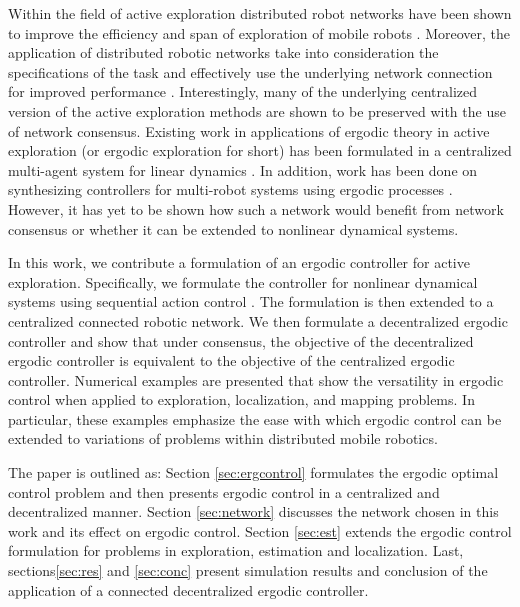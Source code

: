 \documentclass[letterpaper, 10 pt,  conference, twoside]{IEEEtran/IEEEtran}
\theoremstyle{definition}
\begin{document}
Within the field of active exploration distributed robot networks have been shown to improve the efficiency and span of exploration of mobile robots \cite{carmel1999exploration, dudek1996taxonomy, manss2016decentralized}. Moreover, the application of distributed robotic networks take into consideration the specifications of the task and effectively use the underlying network connection for improved performance \cite{manss2016decentralized, viseras2014efficient, khamis2014adaptive, pei2014distributed}. Interestingly, many of the underlying centralized version of the active exploration methods are shown to be preserved with the use of network consensus. Existing work in applications of ergodic theory in active exploration (or ergodic exploration for short) has been formulated in a centralized multi-agent system for linear dynamics \cite{mathew2011metrics}. In addition, work has been done on synthesizing controllers for multi-robot systems using ergodic processes \cite{shell2006ergodic}. However, it has yet to be shown how such a network would benefit from network consensus or whether it can be extended to nonlinear dynamical systems.

In this work, we contribute a formulation of an ergodic controller for active exploration. Specifically, we formulate the controller for nonlinear dynamical systems using sequential action control \cite{ansari2016sequential}. The formulation is then extended to a centralized connected robotic network. We then formulate a decentralized ergodic controller and show that under consensus, the objective of the decentralized ergodic controller is equivalent to the objective of the centralized ergodic controller. Numerical examples are presented that show the versatility in ergodic control when applied to exploration, localization, and mapping problems. In particular, these examples emphasize the ease with which ergodic control can be extended to variations of problems within distributed mobile robotics.

The paper is outlined as: Section \ref{sec:ergcontrol} formulates the ergodic optimal control problem and then presents ergodic control in a centralized and decentralized manner. Section \ref{sec:network} discusses the network chosen in this work and its effect on ergodic control. Section \ref{sec:est} extends the ergodic control formulation for problems in exploration, estimation and localization. Last, sections\ref{sec:res} and \ref{sec:conc} present simulation results and conclusion of the application of a connected decentralized ergodic controller.
\end{document}

